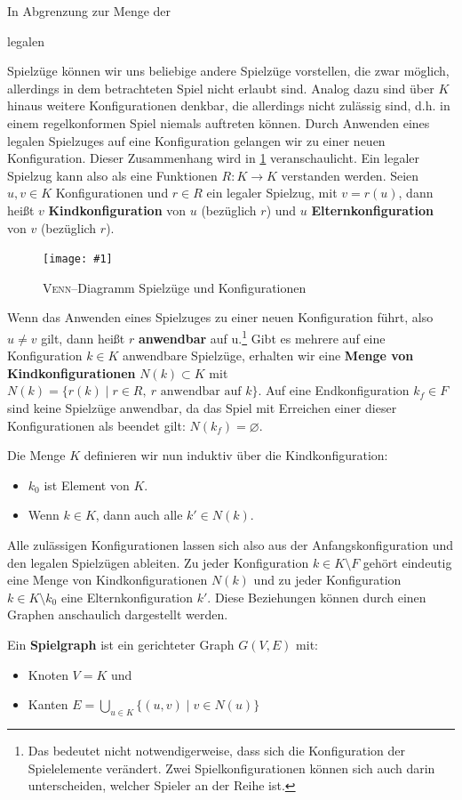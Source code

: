 \documentclass[a4paper,twoside]{scrartcl}
\let\emptyset\varnothing
\newcommand\e[1]{\begin{em}#1\end{em}}
\newcommand\g[4]{%
  \begin{figure}[!ht]
  \label{fig:#2}
  \centering
  \texttt{[image: \#1]}
  \caption{#3}
  \end{figure}}
\begin{document}
In Abgrenzung zur Menge der \e{legalen} Spielzüge können wir uns beliebige andere Spielzüge vorstellen, die zwar möglich, allerdings in dem betrachteten Spiel nicht erlaubt sind. Analog dazu sind über $K$ hinaus weitere Konfigurationen denkbar, die allerdings nicht zulässig sind, d.h. in einem regelkonformen Spiel niemals auftreten können. Durch Anwenden eines legalen Spielzuges auf eine Konfiguration gelangen wir zu einer neuen Konfiguration. Dieser Zusammenhang wird in \ref{fig:venn} veranschaulicht. Ein legaler Spielzug kann also als eine Funktionen $R:K \to K$ verstanden werden. Seien $u,v \in K$ Konfigurationen und $r \in R$ ein legaler Spielzug, mit $v = r(u)$, dann heißt $v$ \textbf{Kindkonfiguration} von $u$ (bezüglich $r$) und $u$ \textbf{Elternkonfiguration} von $v$ (bezüglich $r$). 

\g{img/spielzuege.pdf}{venn}{\textsc{Venn}--Diagramm Spielzüge und Konfigurationen}{.7}

Wenn das Anwenden eines Spielzuges zu einer neuen Konfiguration führt, also $u \neq v$ gilt, dann heißt $r$ \textbf{anwendbar} auf u.\footnote{Das bedeutet nicht notwendigerweise, dass sich die Konfiguration der Spielelemente verändert. Zwei Spielkonfigurationen können sich auch darin unterscheiden, welcher Spieler an der Reihe ist.} Gibt es mehrere auf eine Konfiguration $k \in K$ anwendbare Spielzüge, erhalten wir eine \textbf{Menge von Kindkonfigurationen} $N(k) \subset K$ mit $N(k) = \{r(k) \mid r \in R,~r \textrm{ anwendbar auf } k\}$. Auf eine Endkonfiguration $k_f \in F$ sind keine Spielzüge anwendbar, da das Spiel mit Erreichen einer dieser Konfigurationen als beendet gilt: $N(k_f) = \emptyset$.

Die Menge $K$ definieren wir nun induktiv über die Kindkonfiguration: 
\begin{itemize}
	\item $k_0$ ist Element von $K$.
	\item Wenn $k \in K$, dann auch alle $k' \in N(k)$.
\end{itemize}

Alle zulässigen Konfigurationen lassen sich also aus der Anfangskonfiguration und den legalen Spielzügen ableiten. Zu jeder Konfiguration $k \in K \setminus F$ gehört eindeutig eine Menge von Kindkonfigurationen $N(k)$ und zu jeder Konfiguration $k \in K \setminus k_0$ eine Elternkonfiguration $k'$. Diese Beziehungen können durch einen Graphen anschaulich dargestellt werden.

Ein \textbf{Spielgraph} ist ein gerichteter Graph $G(V,E)$ mit: 
\begin{itemize}
	\item Knoten $V = K$ und
	\item Kanten $E = \bigcup\limits_{u \in K}\{(u,v) \mid v \in N(u)\}$
\end{itemize}
\end{document}
